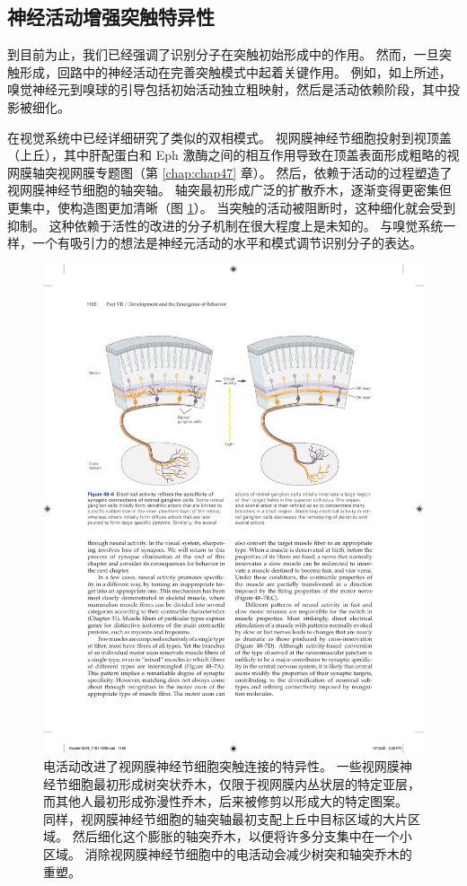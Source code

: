 \subsection{神经活动增强突触特异性}

到目前为止，我们已经强调了识别分子在突触初始形成中的作用。
然而，一旦突触形成，回路中的神经活动在完善突触模式中起着关键作用。
例如，如上所述，嗅觉神经元到嗅球的引导包括初始活动独立粗映射，然后是活动依赖阶段，其中投影被细化。


在视觉系统中已经详细研究了类似的双相模式。
视网膜神经节细胞投射到视顶盖（上丘），其中肝配蛋白和 Eph 激酶之间的相互作用导致在顶盖表面形成粗略的视网膜轴突视网膜专题图（第 \ref{chap:chap47} 章）。
然后，依赖于活动的过程塑造了视网膜神经节细胞的轴突轴。
轴突最初形成广泛的扩散乔木，逐渐变得更密集但更集中，使构造图更加清晰（图 \ref{fig:48_6}）。
当突触的活动被阻断时，这种细化就会受到抑制。 这种依赖于活性的改进的分子机制在很大程度上是未知的。
与嗅觉系统一样，一个有吸引力的想法是神经元活动的水平和模式调节识别分子的表达。


\begin{figure}[htbp]
	\centering
	\includegraphics[width=0.9\linewidth]{chap48/fig_48_6}
	\caption{电活动改进了视网膜神经节细胞突触连接的特异性。 一些视网膜神经节细胞最初形成树突状乔木，仅限于视网膜内丛状层的特定亚层，而其他人最初形成弥漫性乔木，后来被修剪以形成大的特定图案。 同样，视网膜神经节细胞的轴突轴最初支配上丘中目标区域的大片区域。 然后细化这个膨胀的轴突乔木，以便将许多分支集中在一个小区域。 消除视网膜神经节细胞中的电活动会减少树突和轴突乔木的重塑。}
	\label{fig:48_6}
\end{figure}


